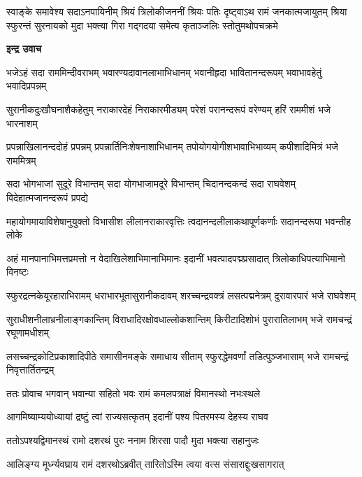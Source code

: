 \fourlineindentedshloka
{स्वाङ्के समावेश्य सदाऽनपायिनीम्}
{श्रियं त्रिलोकीजननीं श्रियः पतिः}
{दृष्ट्वाऽथ रामं जनकात्मजायुतम्}
{श्रिया स्फुरन्तं सुरनायको मुदा}
{भक्त्या गिरा गद्गदया समेत्य}
{कृताञ्जलिः स्तोतुमथोपचक्रमे} %

\textbf{इन्द्र उवाच}

\fourlineindentedshloka
{भजेऽहं सदा राममिन्दीवराभम्}
{भवारण्यदावानलाभाभिधानम्}
{भवानीहृदा भावितानन्दरूपम्}
{भवाभावहेतुं भवादिप्रपन्नम्} %

\fourlineindentedshloka
{सुरानीकदुःखौघनाशैकहेतुम्}
{नराकारदेहं निराकारमीड्यम्}
{परेशं परानन्दरूपं वरेण्यम्}
{हरिं राममीशं भजे भारनाशम्} %

\fourlineindentedshloka
{प्रपन्नाखिलानन्ददोहं प्रपन्नम्}
{प्रपन्नार्तिनिःशेषनाशाभिधानम्}
{तपोयोगयोगीशभावाभिभाव्यम्}
{कपीशादिमित्रं भजे राममित्रम्} %

\fourlineindentedshloka
{सदा भोगभाजां सुदूरे विभान्तम्}
{सदा योगभाजामदूरे विभान्तम्}
{चिदानन्दकन्दं सदा राघवेशम्}
{विदेहात्मजानन्दरूपं प्रपद्ये} %

\fourlineindentedshloka
{महायोगमायाविशेषानुयुक्तो}
{विभासीश लीलानराकारवृत्तिः}
{त्वदानन्दलीलाकथापूर्णकर्णाः}
{सदानन्दरूपा भवन्तीह लोके} %

\fourlineindentedshloka
{अहं मानपानाभिमत्तप्रमत्तो}
{न वेदाखिलेशाभिमानाभिमानः}
{इदानीं भवत्पादपद्मप्रसादात्}
{त्रिलोकाधिपत्याभिमानो विनष्टः} %

\fourlineindentedshloka
{स्फुरद्रत्नकेयूरहाराभिरामम्}
{धराभारभूतासुरानीकदावम्}
{शरच्चन्द्रवक्त्रं लसत्पद्मनेत्रम्}
{दुरावारपारं भजे राघवेशम्} %

\fourlineindentedshloka
{सुराधीशनीलाभ्रनीलाङ्गकान्तिम्}
{विराधादिरक्षोवधाल्लोकशान्तिम्}
{किरीटादिशोभं पुरारातिलाभम्}
{भजे रामचन्द्रं रघूणामधीशम्} %

\fourlineindentedshloka
{लसच्चन्द्रकोटिप्रकाशादिपीठे}
{समासीनमङ्के समाधाय सीताम्}
{स्फुरद्धेमवर्णां तडित्पुञ्जभासाम्}
{भजे रामचन्द्रं निवृत्तार्तितन्द्रम्} %

\twolineshloka
{ततः प्रोवाच भगवान् भवान्या सहितो भवः}
{रामं कमलपत्राक्षं विमानस्थो नभःस्थले} %

\twolineshloka
{आगमिष्याम्ययोध्यायां द्रष्टुं त्वां राज्यसत्कृतम्}
{इदानीं पश्य पितरमस्य देहस्य राघव} %

\twolineshloka
{ततोऽपश्यद्विमानस्थं रामो दशरथं पुरः}
{ननाम शिरसा पादौ मुदा भक्त्या सहानुजः} %

\twolineshloka
{आलिङ्ग्य मूर्ध्न्यवघ्राय रामं दशरथोऽब्रवीत्}
{तारितोऽस्मि त्वया वत्स संसाराद्दुःखसागरात्} %

